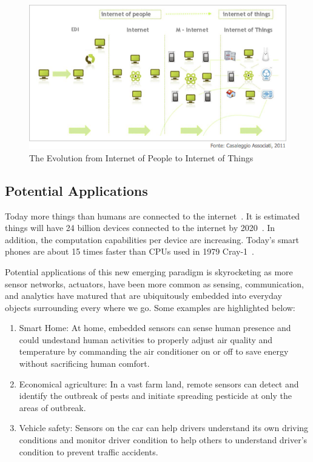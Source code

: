 \begin{figure}[h!]
\centering
    \includegraphics[width=\linewidth]{figures/evolution}
\caption{The Evolution from Internet of People to Internet of Things}
\label{fig:evolution}
\end{figure}


\subsection{Potential Applications}

Today more things than humans are connected to the internet~\cite{CISCO}. It is
estimated things will have 24 billion devices connected to the internet by
2020~\cite{Malik}. In addition, the computation capabilities per device are
increasing. Today's smart phones are about 15 times faster than CPUs used in
1979 Cray-1~\cite{Randomly2010}. 

Potential applications of this new emerging paradigm is skyrocketing as more
sensor networks, actuators, have been more common as sensing, communication, and
analytics have matured that are ubiquitously embedded into everyday objects
surrounding every where we go. Some examples are highlighted below:
\begin{enumerate}
\item Smart Home: At home, embedded sensors can sense human presence and could
undestand human activities to properly adjust air quality and temperature by
commanding the air conditioner on or off to save energy without sacrificing
human comfort.
\item Economical agriculture: In a vast farm land, remote sensors can detect and
identify the outbreak of pests and initiate spreading pesticide at only the
areas of outbreak.
\item Vehicle safety: Sensors on the car can help drivers understand its own
driving conditions and monitor driver condition to help others to understand
driver's condition to prevent traffic accidents.
\end{enumerate}

